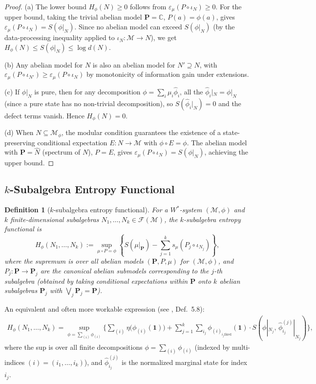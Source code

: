 \documentclass[12pt,a4paper]{article}
\newtheorem{definition}[theorem]{Definition}
\newcommand{\CC}{\mathbb{C}}
\newcommand{\id}{\mathbf{1}}  %
\newcommand{\vN}{\mathcal{M}}      %
\newcommand{\Hphi}{H_{\phi}}
\newcommand{\eps}{\varepsilon}
\begin{document}
\begin{proof}
(a) The lower bound $\Hphi(N)\ge 0$ follows from $\eps_\mu(P\circ\iota_N)\ge 0$.
For the upper bound, taking the trivial abelian model $\mathbf{P}=\CC$, $P(a)=\phi(a)$,
gives $\eps_\mu(P\circ\iota_N)=S(\phi|_N)$.
Since no abelian model can exceed $S(\phi|_N)$ (by the data-processing inequality applied
to $\iota_N:\vN\to N$), we get $\Hphi(N)\le S(\phi|_N)\le\log d(N)$.

(b) Any abelian model for $N$ is also an abelian model for $N'\supseteq N$, with
$\eps_\mu(P\circ\iota_{N'})\ge\eps_\mu(P\circ\iota_N)$ by monotonicity of
information gain under extensions.

(c) If $\phi|_N$ is pure, then for any decomposition $\phi=\sum_i\mu_i\hat\phi_i$,
all the $\hat\phi_i|_N=\phi|_N$ (since a pure state has no non-trivial decomposition),
so $S(\hat\phi_i|_N)=0$ and the defect terms vanish.  Hence $\Hphi(N)=0$.

(d) When $N\subseteq\mathcal{M}_\phi$, the modular condition guarantees the existence
of a state-preserving conditional expectation $E:N\to\vN$ with $\phi\circ E=\phi$.
The abelian model with $\mathbf{P}=\hat N$ (spectrum of $N$), $P=E$, gives
$\eps_\mu(P\circ\iota_N)=S(\phi|_N)$, achieving the upper bound.
\end{proof}

\subsection{$k$-Subalgebra Entropy Functional}

\begin{definition}[$k$-subalgebra entropy functional]\label{def:Hk}
For a $W^*$-system $(\vN,\phi)$ and $k$ finite-dimensional subalgebras
$N_1,\ldots,N_k\in\mathcal{F}(\vN)$, the \emph{$k$-subalgebra entropy functional} is
\begin{equation}\label{eq:Hk}
  \Hphi(N_1,\ldots,N_k)
  := \sup_{\mu\circ P=\phi}
  \left\{S(\mu|_\mathbf{P}) - \sum_{j=1}^k s_\mu(P_j\circ\iota_{N_j})\right\},
\end{equation}
where the supremum is over all abelian models $(\mathbf{P},P,\mu)$ for $(\vN,\phi)$,
and $P_j: \mathbf{P}\to\mathbf{P}_j$ are the canonical abelian submodels corresponding
to the $j$-th subalgebra (obtained by taking conditional expectations within $\mathbf{P}$
onto $k$ abelian subalgebras $\mathbf{P}_j$ with $\bigvee_j\mathbf{P}_j=\mathbf{P}$).
\end{definition}

An equivalent and often more workable expression (see \cite{cnt87}, Def.~5.8):
\begin{multline}\label{eq:Hk_equiv}
  \Hphi(N_1,\ldots,N_k)
  = \sup_{\phi=\sum_{(i)}\phi_{(i)}}
  \Bigg\{
    \sum_{(i)}\eta\bigl(\phi_{(i)}(\id)\bigr)
    + \sum_{j=1}^k\sum_{i_j}
      \phi_{(i)_{i_j\text{fixed}}}(\id)\cdot
      S\!\left(\phi|_{N_j},\,\hat\phi^{(j)}_{i_j}|_{N_j}\right)
  \Bigg\},
\end{multline}
where the sup is over all finite decompositions $\phi=\sum_{(i)}\phi_{(i)}$ (indexed by
multi-indices $(i)=(i_1,\ldots,i_k)$), and $\hat\phi^{(j)}_{i_j}$ is the normalized
marginal state for index $i_j$.
\end{document}
